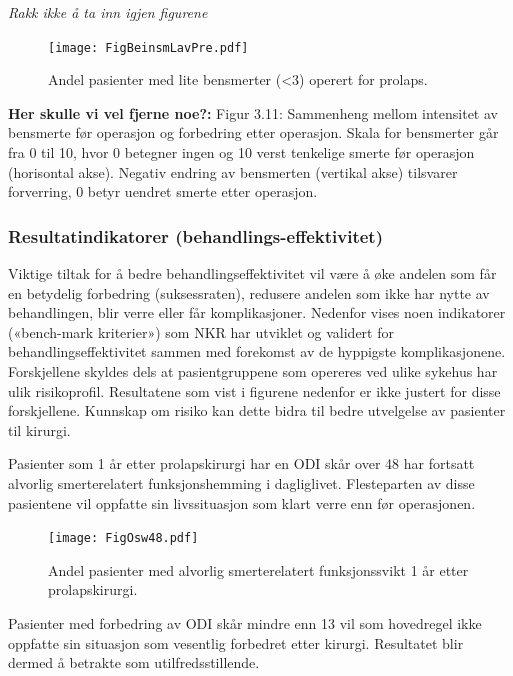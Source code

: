 \documentclass [norsk,a4paper,twoside]{article}\usepackage[]{graphicx}\usepackage[]{color}
\begin{document}
\textit{Rakk ikke å ta inn igjen figurene}

\begin{figure}[ht]
\centering \texttt{[image: FigBeinsmLavPre.pdf]}
\caption{\label{fig:BeinsmLavPre}  Andel pasienter med lite bensmerter (<3) operert for prolaps.}
\end{figure}

\textbf{Her skulle vi vel fjerne noe?:}
Figur 3.11: Sammenheng mellom intensitet av bensmerte før operasjon og
forbedring etter operasjon. Skala for bensmerter går fra 0 til 10, hvor 0 betegner
ingen og 10 verst tenkelige smerte før operasjon (horisontal akse). Negativ endring
av bensmerten (vertikal akse) tilsvarer forverring, 0 betyr uendret smerte etter
operasjon.





\subsubsection{Resultatindikatorer (behandlings-effektivitet)}
Viktige tiltak for å bedre behandlingseffektivitet vil være å øke andelen som får en
betydelig forbedring (suksessraten), redusere andelen som ikke har nytte av
behandlingen, blir verre eller får komplikasjoner. Nedenfor vises noen indikatorer
(«bench-mark kriterier») som NKR har utviklet og validert for
behandlingseffektivitet sammen med forekomst av de hyppigste komplikasjonene.
Forskjellene skyldes dels at pasientgruppene som opereres ved ulike sykehus har
ulik risikoprofil. Resultatene som vist i figurene nedenfor er ikke justert for disse
forskjellene. Kunnskap om risiko kan dette bidra til bedre utvelgelse av pasienter til
kirurgi.




Pasienter som 1 år etter prolapskirurgi har en ODI skår over 48 har fortsatt alvorlig
smerterelatert funksjonshemming i dagliglivet. Flesteparten av disse pasientene vil
oppfatte sin livssituasjon som klart verre enn før operasjonen.
\begin{figure}[ht]
\centering \texttt{[image: FigOsw48.pdf]}
\caption{\label{fig:Osw48}  Andel pasienter med alvorlig smerterelatert funksjonssvikt 1 år etter
prolapskirurgi.}
\end{figure}

\clearpage

Pasienter med forbedring av ODI skår mindre enn 13 vil som hovedregel ikke
oppfatte sin situasjon som vesentlig forbedret etter kirurgi. Resultatet blir dermed å
betrakte som utilfredsstillende. 
\end{document}
